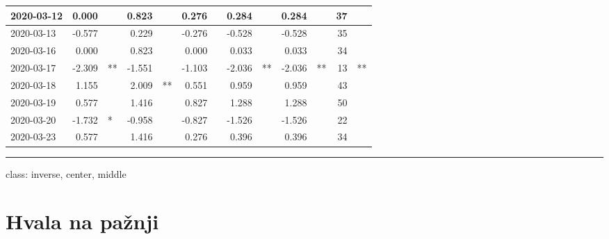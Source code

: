 \documentclass[
]{article}
\begin{document}
\begin{table}
\begin{tabular}[t]{l|r|l|r|l|r|l|r|l|r|l|r|l}
\hline
2020-03-12 & 0.000 &  & 0.823 &  & 0.276 &  & 0.284 &  & 0.284 &  & 37 & \\
\hline
2020-03-13 & -0.577 &  & 0.229 &  & -0.276 &  & -0.528 &  & -0.528 &  & 35 & \\
\hline
2020-03-16 & 0.000 &  & 0.823 &  & 0.000 &  & 0.033 &  & 0.033 &  & 34 & \\
\hline
2020-03-17 & -2.309 & ** & -1.551 &  & -1.103 &  & -2.036 & ** & -2.036 & ** & 13 & **\\
\hline
2020-03-18 & 1.155 &  & 2.009 & ** & 0.551 &  & 0.959 &  & 0.959 &  & 43 & \\
\hline
2020-03-19 & 0.577 &  & 1.416 &  & 0.827 &  & 1.288 &  & 1.288 &  & 50 & \\
\hline
2020-03-20 & -1.732 & * & -0.958 &  & -0.827 &  & -1.526 &  & -1.526 &  & 22 & \\
\hline
2020-03-23 & 0.577 &  & 1.416 &  & 0.276 &  & 0.396 &  & 0.396 &  & 34 & \\
\hline
\end{tabular}
\end{table}

\begin{center}\rule{0.5\linewidth}{0.5pt}\end{center}

class: inverse, center, middle

\hypertarget{hvala-na-paux17enji}{%
\section{Hvala na pažnji}\label{hvala-na-paux17enji}}
\end{document}

